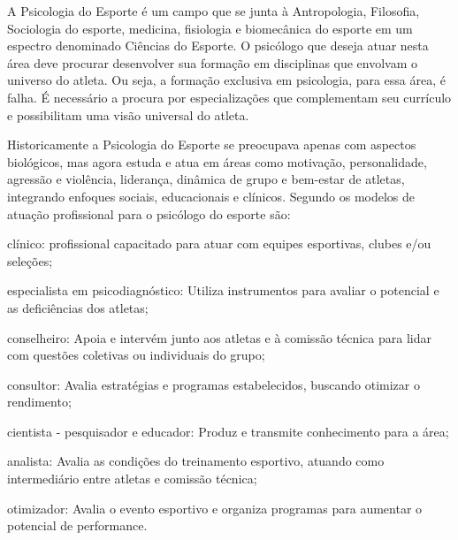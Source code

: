 \begin{Desenvolvimento} %

A Psicologia do Esporte é um campo que se junta à Antropologia, Filosofia, Sociologia do esporte, medicina, fisiologia e biomecânica do esporte em um espectro denominado Ciências do Esporte. O psicólogo que deseja atuar nesta área deve procurar desenvolver sua formação em  disciplinas que envolvam o universo do atleta. Ou seja, a formação exclusiva em psicologia, para essa área, é falha. É necessário a procura por especializações que complementam seu currículo e possibilitam uma visão universal do atleta.

Historicamente a Psicologia do Esporte se preocupava apenas com aspectos biológicos, mas agora estuda e atua em áreas como motivação, personalidade, agressão e violência, liderança, dinâmica de grupo e bem-estar de atletas, integrando enfoques sociais, educacionais e clínicos. Segundo  os modelos de atuação profissional para o psicólogo do esporte são:

\begin{alinea}
  \item clínico: profissional capacitado para atuar com equipes esportivas, clubes e/ou seleções;
  \item especialista em psicodiagnóstico: Utiliza instrumentos para avaliar o potencial e as deficiências dos atletas;
  \item conselheiro: Apoia e intervém junto aos atletas e à comissão técnica para lidar com questões coletivas ou individuais do grupo;
  \item consultor: Avalia estratégias e programas estabelecidos, buscando otimizar o rendimento;
  \item cientista - pesquisador e educador: Produz e transmite conhecimento para a área;
  \item analista: Avalia as condições do treinamento esportivo, atuando como intermediário entre atletas e comissão técnica;
  \item otimizador: Avalia o evento esportivo e organiza programas para aumentar o potencial de performance.
\end{alinea}


\end{Desenvolvimento}
